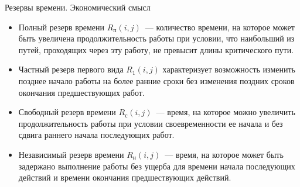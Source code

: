 \documentclass[unicode,11pt,notheorems]{beamer}
\begin{document}
\begin{frame}{Резервы времени. Экономический смысл}
	\begin{itemize}
	\item \alert{Полный резерв времени $R_\text{п}(i,j)$}~--- количество времени, на которое может быть увеличена продолжительность работы при условии, что наибольший из путей, проходящих через эту работу, не превысит длины критического пути.
	\item \alert{Частный резерв первого вида $R_\text{1}(i,j)$} характеризует возможность изменить позднее начало работы на более ранние сроки без изменения поздних сроков окончания предшествующих работ.
	\item \alert{Свободный резерв времени	$R_\text{с}(i,j)$}~--- время, на которое можно увеличить продолжительность работы при условии своевременности ее начала и без сдвига раннего начала последующих работ.
	\item \alert{Независимый резерв времени $R_\text{н}(i,j)$}~--- время, на которое может быть задержано выполнение работы без ущерба для времени начала последующих действий и времени окончания предшествующих действий. 
	\end{itemize}
\end{frame}
\end{document}
